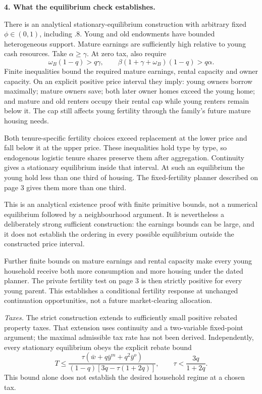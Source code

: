 \documentclass[11pt]{article}
\begin{document}
\newpage
\textbf{4. What the equilibrium check establishes.}

There is an analytical stationary-equilibrium construction with arbitrary
fixed $\phi\in(0,1)$, including $.8$. Young and old endowments have bounded
heterogeneous support. Mature earnings are sufficiently high relative to
young cash resources. Take $\alpha\ge\gamma$. At zero tax, also require
\[
\omega_B(1-q)>q\gamma,\qquad
\beta(1+\gamma+\omega_B)(1-q)>q\alpha.
\]
Finite inequalities bound the required mature earnings, rental capacity and
owner capacity. On an explicit positive price interval they imply: young
owners borrow maximally; mature owners save; both later owner homes exceed
the young home; and mature and old renters occupy their rental cap while
young renters remain below it. The cap still affects young fertility through
the family's future mature housing needs.

Both tenure-specific fertility choices exceed replacement at the lower price
and fall below it at the upper price. These inequalities hold type by type,
so endogenous logistic tenure shares preserve them after aggregation.
Continuity gives a stationary equilibrium inside that interval. At such an
equilibrium the young hold less than one third of housing. The fixed-fertility
planner described on page 3 gives them more than one third.

This is an analytical existence proof with finite primitive bounds, not a
numerical equilibrium followed by a neighbourhood argument. It is nevertheless
a deliberately strong sufficient construction: the earnings bounds can be
large, and it does not establish the ordering in every possible equilibrium
outside the constructed price interval.

Further finite bounds on mature earnings and rental capacity make every young
household receive both more consumption and more housing under the dated planner.
The private fertility test on page 3 is then strictly positive for every young
parent. This establishes a conditional fertility response at unchanged
continuation opportunities, not a future market-clearing allocation.

\textit{Taxes.} The strict construction extends to sufficiently small positive
rebated property taxes. That extension uses continuity and a two-variable
fixed-point argument; the maximal admissible tax rate has not been derived.
Independently, every stationary equilibrium obeys the explicit rebate bound
\[
T\le
\frac{\tau(\bar w+q\bar y^m+q^2\bar y^o)}
{(1-q)[3q-\tau(1+2q)]},
\qquad \tau<\frac{3q}{1+2q}.
\]
This bound alone does not establish the desired household regime at a chosen tax.
\end{document}
